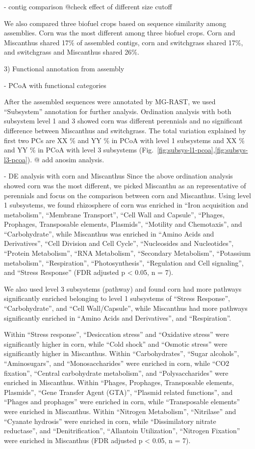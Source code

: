 \documentclass[12pt]{article}
\begin{document}
- contig comparison @check effect of different size cutoff

We also compared three biofuel crops based on sequence similarity among assemblies. Corn was the most different among three biofuel crops. Corn and Miscanthus shared 17\% of assembled contigs, corn and switchgrass shared 17\%, and switchgrass and Miscanthus shared 26\%.

3) Functional annotation from assembly

- PCoA with functional categories

After the assembled sequences were annotated by MG-RAST, we used ``Subsystem'' annotation for further analysis. Ordination analysis with both subsystem level 1 and 3 showed corn was different perennials and no significant difference between Miscanthus and switchgrass. The total variation explained by first two PCs are XX \% and YY \% in PCoA with level 1 subsystems and XX \% and YY \% in PCoA with level 3 subsystems (Fig.~\ref{fig:subsys-l1-pcoa},\ref{fig:subsys-l3-pcoa}). @ add anosim analysis.

- DE analysis with corn and Miscanthus
Since the above ordination analysis showed corn was the most different, we picked Miscanthu as an representative of perennials and focus on the comparison between corn and Miscanthus. Using level 1 subsystems, we found rhizosphere of corn was enriched in ``Iron acquisition and metabolism'', ``Membrane Transport'', ``Cell Wall and Capsule'', ``Phages, Prophages, Transposable elements, Plasmids'', ``Motility and Chemotaxis'', and ``Carbohydrate'', while Miscanthus was enriched in ``Amino Acids and Derivatives'', ``Cell Division and Cell Cycle'', ``Nucleosides and Nucleotides'', ``Protein Metabolism'', ``RNA Metabolism'', ``Secondary Metabolism'', ``Potassium metabolism'', ``Respiration'', ``Photosynthesis'', ``Regulation and Cell signaling'', and ``Stress Response'' (FDR adjusted p < 0.05, n = 7).

We also used level 3 subsystems (pathway) and found corn had more pathways significantly enriched belonging to level 1 subsystems of ``Stress Response'', ``Carbohydrate'', and ``Cell Wall/Capsule'', while Miscanthus had more pathways significantly enriched in ``Amino Acids and Derivatives'', and ``Respiration''.

Within ``Stress response'', ``Desiccation stress'' and  ``Oxidative stress'' were significantly higher in corn, while ``Cold shock'' and ``Osmotic stress'' were significantly higher in Miscanthus. Within ``Carbohydrates'', ``Sugar alcohols'', ``Aminosugars'', and ``Monosaccharides'' were enriched in corn, while ``CO2 fixation'', ``Central carbohydrate metabolism'', and ``Polysaccharides'' were enriched in Miscanthus. Within ``Phages, Prophages, Transposable elements, Plasmids'', ``Gene Transfer Agent (GTA)'', ``Plasmid related functions'', and ``Phages and prophages'' were enriched in corn, while ``Transposable elements'' were enriched in Miscanthus. Within ``Nitrogen Metabolism'', ``Nitrilase'' and ``Cyanate hydrosis'' were enriched in corn, while ``Dissimilatory nitrate reductase'', and ``Denitrification'', ``Allantoin Utilization'', ``Nitrogen Fixation''  were enriched in Miscanthus (FDR adjusted p < 0.05, n = 7).
\end{document}
